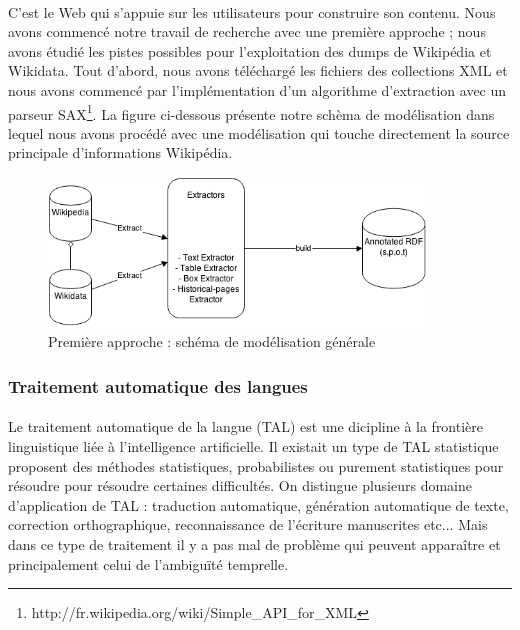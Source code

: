 \documentclass[12pt,a4	]{report}
\begin{document}
\paragraph{}
C'est le Web qui s'appuie sur les utilisateurs pour construire son contenu. Nous avons commencé notre travail de recherche avec une première approche ; nous avons étudié les pistes possibles pour l'exploitation des dumps de Wikipédia et Wikidata. Tout d'abord, nous avons téléchargé les fichiers des collections XML et nous avons commencé par l'implémentation d'un algorithme d'extraction avec un parseur SAX\footnote{http://fr.wikipedia.org/wiki/Simple\_API\_for\_XML}.
La figure ci-dessous présente notre schèma de modélisation dans lequel nous avons procédé avec une modélisation qui touche directement la source principale d'informations Wikipédia.
\begin{figure}[H]
        \centering
                \centering
                \includegraphics[width=10cm]{modelisation.png}
               \caption{Première approche : schéma de modélisation générale}

\end{figure}
\subsubsection*{Traitement automatique des langues}
\paragraph{}
Le traitement automatique de la langue (TAL) est une dicipline à la frontière linguistique liée à l'intelligence artificielle.
Il existait un type de TAL statistique proposent des méthodes statistiques, probabilistes ou purement statistiques pour résoudre pour résoudre certaines difficultés.
On distingue plusieurs domaine d'application de TAL : traduction automatique, génération automatique de texte, correction orthographique, reconnaissance de l'écriture manuscrites etc...
Mais dans ce type de traitement il y a pas mal de problème qui peuvent apparaître et principalement celui de l'ambiguïté temprelle.
\end{document}
